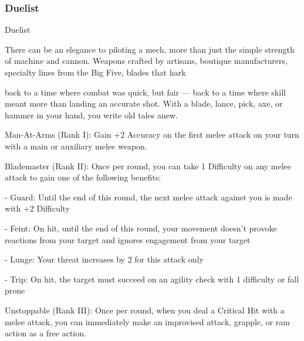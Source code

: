 \subsubsection{Duelist}

                                                     Duelist

There can be an elegance to piloting a mech, more than just the simple strength of machine and cannon.
Weapons crafted by artisans, boutique manufacturers, specialty lines from the Big Five, blades that hark

back to a time where combat was quick, but fair — back to a time where skill meant more than landing an
accurate shot. With a blade, lance, pick, axe, or hammer in your hand, you write old tales anew.

Man-At-Arms (Rank I): Gain +2 Accuracy on the first melee attack on your turn with a main or
auxiliary melee weapon.

Blademaster (Rank II): Once per round, you can take 1 Difficulty on any melee attack to gain
one of the following benefits:

     -   Guard: Until the end of this round, the next melee attack against you is made with +2
         Difficulty

     -   Feint: On hit, until the end of this round, your movement doesn't provoke reactions from
         your target and ignores engagement from your target

     -   Lunge: Your threat increases by 2 for this attack only

     -   Trip: On hit, the target must succeed on an agility check with 1 difficulty or fall prone

Unstoppable (Rank III): Once per round, when you deal a Critical Hit with a melee attack, you
can immediately make an improvised attack, grapple, or ram action as a free action.
